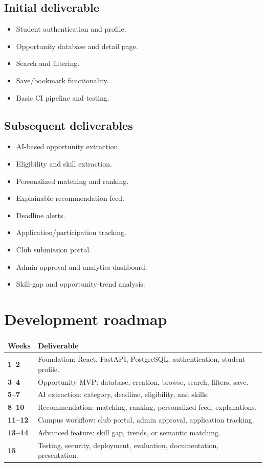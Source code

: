 \documentclass[11pt,a4paper]{article}
\begin{document}
\subsection{Initial deliverable}

\begin{itemize}
\item Student authentication and profile.
\item Opportunity database and detail page.
\item Search and filtering.
\item Save/bookmark functionality.
\item Basic CI pipeline and testing.
\end{itemize}

\subsection{Subsequent deliverables}

\begin{itemize}
\item AI-based opportunity extraction.
\item Eligibility and skill extraction.
\item Personalized matching and ranking.
\item Explainable recommendation feed.
\item Deadline alerts.
\item Application/participation tracking.
\item Club submission portal.
\item Admin approval and analytics dashboard.
\item Skill-gap and opportunity-trend analysis.
\end{itemize}

\section{Development roadmap}

\begin{center}
\begin{tabularx}{\textwidth}{>{\bfseries}p{1.5cm} X}
\toprule
Weeks & Deliverable\\
\midrule
1--2 & Foundation: React, FastAPI, PostgreSQL, authentication, student profile.\\
3--4 & Opportunity MVP: database, creation, browse, search, filters, save.\\
5--7 & AI extraction: category, deadline, eligibility, and skills.\\
8--10 & Recommendation: matching, ranking, personalized feed, explanations.\\
11--12 & Campus workflow: club portal, admin approval, application tracking.\\
13--14 & Advanced feature: skill gap, trends, or semantic matching.\\
15 & Testing, security, deployment, evaluation, documentation, presentation.\\
\bottomrule
\end{tabularx}
\end{center}
\end{document}

